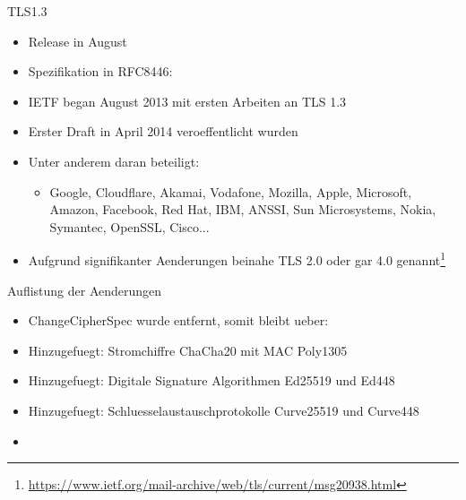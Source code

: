 \documentclass{f4_beamer_metropolis}
\begin{document}
\begin{frame}{TLS1.3}
  \begin{itemize}
    \item Release in August \citeyear{RFC8446}
    \item Spezifikation in RFC8446: \textit{}
    \item IETF began August 2013 mit ersten Arbeiten an TLS 1.3
    \item Erster Draft in April 2014 veroeffentlicht wurden
    \item Unter anderem daran beteiligt:
    \begin{itemize}
      \item Google, Cloudflare, Akamai, Vodafone, Mozilla, Apple, Microsoft, Amazon, Facebook, Red Hat, IBM, ANSSI, Sun Microsystems, Nokia, Symantec, OpenSSL, Cisco...
    \end{itemize}
    \item Aufgrund signifikanter Aenderungen beinahe TLS 2.0 oder gar 4.0 genannt\footnote{\url{https://www.ietf.org/mail-archive/web/tls/current/msg20938.html}}
  \end{itemize}

\end{frame}

\begin{frame}{Auflistung der Aenderungen}
  \begin{itemize}
  \item ChangeCipherSpec wurde entfernt, somit bleibt ueber: \\
  \item Hinzugefuegt: Stromchiffre ChaCha20 mit MAC Poly1305
  \item Hinzugefuegt: Digitale Signature Algorithmen Ed25519 und Ed448
  \item Hinzugefuegt: Schluesselaustauschprotokolle Curve25519 und Curve448
  \item
\end{itemize}
\end{frame}

\end{document}
